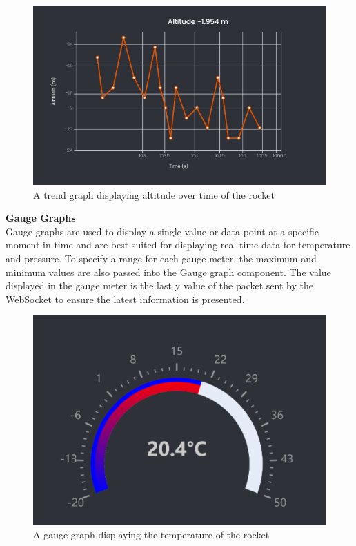 \begin{figure}[H]
    \includegraphics [scale=0.75] {ui_trend_graph}
    \centering
     {A trend graph displaying altitude over time of the rocket}
\end{figure}



\textbf{Gauge Graphs}
\\Gauge graphs are used to display a single value or data point at a specific moment in
time and are best suited for displaying real-time data for temperature and pressure. To specify a range for each
gauge meter, the maximum and minimum values are also passed into the Gauge graph component. The value 
displayed in the gauge meter is the last y value of the packet sent by the WebSocket to ensure the latest information
is presented. 


\begin{figure}[H]
    \includegraphics [scale=0.75] {ui_gauge_graph}
    \centering
     {A gauge graph displaying the temperature of the rocket}
\end{figure}

